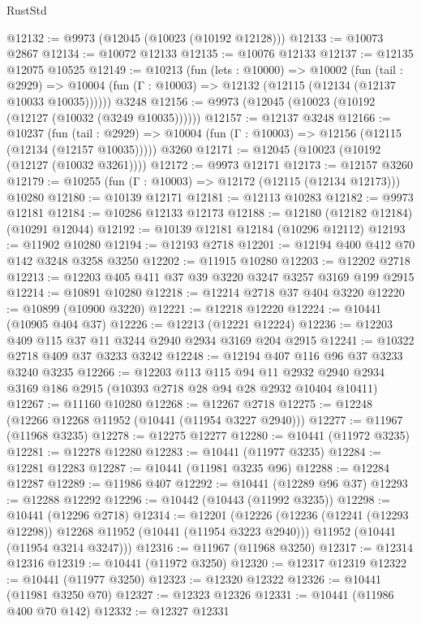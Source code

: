 \begin{lexlean}{RustStd}
\begin{coremodule}
@12132 := @9973 (@12045 (@10023 (@10192 @12128)))
@12133 := @10073 @2867
@12134 := @10072 @12133
@12135 := @10076 @12133
@12137 := @12135 @12075 @10525
@12149 := @10213
    (fun (lets : @10000) =>
    @10002
      (fun (tail : @2929) =>
      @10004 (fun (Γ : @10003) => @12132 (@12115 (@12134 (@12137 @10033 @10035))))))
    @3248
@12156 := @9973 (@12045 (@10023 (@10192 (@12127 (@10032 (@3249 @10035))))))
@12157 := @12137 @3248
@12166 := @10237
    (fun (tail : @2929) => @10004 (fun (Γ : @10003) => @12156 (@12115 (@12134 (@12157 @10035)))))
    @3260
@12171 := @12045 (@10023 (@10192 (@12127 (@10032 @3261))))
@12172 := @9973 @12171
@12173 := @12157 @3260
@12179 := @10255 (fun (Γ : @10003) => @12172 (@12115 (@12134 @12173))) @10280
@12180 := @10139 @12171
@12181 := @12113 @10283
@12182 := @9973 @12181
@12184 := @10286 @12133 @12173
@12188 := @12180 (@12182 @12184) (@10291 @12044)
@12192 := @10139 @12181 @12184 (@10296 @12112)
@12193 := @11902 @10280
@12194 := @12193 @2718
@12201 := @12194 @400 @412 @70 @142 @3248 @3258 @3250
@12202 := @11915 @10280
@12203 := @12202 @2718
@12213 := @12203 @405 @411 @37 @39 @3220 @3247 @3257 @3169 @199 @2915
@12214 := @10891 @10280
@12218 := @12214 @2718 @37 @404 @3220
@12220 := @10899 (@10900 @3220)
@12221 := @12218 @12220
@12224 := @10441 (@10905 @404 @37)
@12226 := @12213 (@12221 @12224)
@12236 := @12203 @409 @115 @37 @11 @3244 @2940 @2934 @3169 @204 @2915
@12241 := @10322 @2718 @409 @37 @3233 @3242
@12248 := @12194 @407 @116 @96 @37 @3233 @3240 @3235
@12266 := @12203
    @113
    @115
    @94
    @11
    @2932
    @2940
    @2934
    @3169
    @186
    @2915
    (@10393 @2718 @28 @94 @28 @2932 @10404 @10411)
@12267 := @11160 @10280
@12268 := @12267 @2718
@12275 := @12248 (@12266 @12268 @11952 (@10441 (@11954 @3227 @2940)))
@12277 := @11967 (@11968 @3235)
@12278 := @12275 @12277
@12280 := @10441 (@11972 @3235)
@12281 := @12278 @12280
@12283 := @10441 (@11977 @3235)
@12284 := @12281 @12283
@12287 := @10441 (@11981 @3235 @96)
@12288 := @12284 @12287
@12289 := @11986 @407
@12292 := @10441 (@12289 @96 @37)
@12293 := @12288 @12292
@12296 := @10442 (@10443 (@11992 @3235))
@12298 := @10441 (@12296 @2718)
@12314 := @12201
    (@12226
      (@12236 (@12241 (@12293 @12298)) @12268 @11952 (@10441 (@11954 @3223 @2940)))
      @11952
      (@10441 (@11954 @3214 @3247)))
@12316 := @11967 (@11968 @3250)
@12317 := @12314 @12316
@12319 := @10441 (@11972 @3250)
@12320 := @12317 @12319
@12322 := @10441 (@11977 @3250)
@12323 := @12320 @12322
@12326 := @10441 (@11981 @3250 @70)
@12327 := @12323 @12326
@12331 := @10441 (@11986 @400 @70 @142)
@12332 := @12327 @12331

\end{coremodule}
\end{lexlean}
